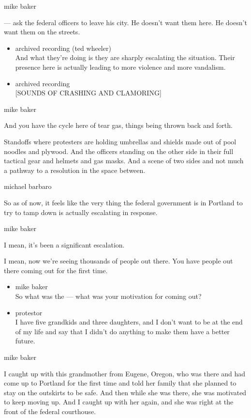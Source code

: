 mike baker

--- ask the federal officers to leave his city. He doesn't want them
here. He doesn't want them on the streets.

\begin{itemize}
\item
  archived recording (ted wheeler)\\
  And what they're doing is they are sharply escalating the situation.
  Their presence here is actually leading to more violence and more
  vandalism.
\item
  archived recording\\
  {[}SOUNDS OF CRASHING AND CLAMORING{]}
\end{itemize}

mike baker

And you have the cycle here of tear gas, things being thrown back and
forth.

Standoffs where protesters are holding umbrellas and shields made out of
pool noodles and plywood. And the officers standing on the other side in
their full tactical gear and helmets and gas masks. And a scene of two
sides and not much a pathway to a resolution in the space between.

michael barbaro

So as of now, it feels like the very thing the federal government is in
Portland to try to tamp down is actually escalating in response.

mike baker

I mean, it's been a significant escalation.

I mean, now we're seeing thousands of people out there. You have people
out there coming out for the first time.

\begin{itemize}
\item
  mike baker\\
  So what was the --- what was your motivation for coming out?
\item
  protestor\\
  I have five grandkids and three daughters, and I don't want to be at
  the end of my life and say that I didn't do anything to make them have
  a better future.
\end{itemize}

mike baker

I caught up with this grandmother from Eugene, Oregon, who was there and
had come up to Portland for the first time and told her family that she
planned to stay on the outskirts to be safe. And then while she was
there, she was motivated to keep moving up. And I caught up with her
again, and she was right at the front of the federal courthouse.

